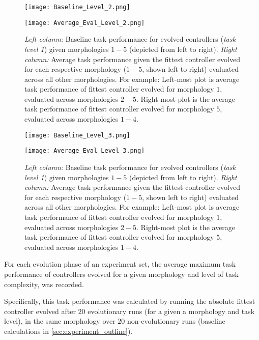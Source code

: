 \begin{figure*}[t]
	\begin{minipage}{0.5\textwidth}
		\texttt{[image: Baseline\_Level\_2.png]}
	\end{minipage}
	\begin{minipage}{0.5\textwidth}
		\texttt{[image: Average\_Eval\_Level\_2.png]}
	\end{minipage}
\caption{\textit{Left column:} Baseline task performance for evolved controllers (\textit{task level 1})
given morphologies $1-5$ (depicted from left to right).
\textit{Right column:} Average task performance given the fittest controller evolved
for each respective morphology ($1-5$, shown left to right) evaluated across all other morphologies.
For example: Left-most plot is average task performance of fittest controller evolved for
morphology $1$, evaluated across morphologies $2-5$.  Right-most plot is the average task performance
of fittest controller evolved for morphology $5$, evaluated across morphologies $1-4$.}\label{fig:level2results}
\end{figure*}

\begin{figure*}[t]
	\begin{minipage}{0.5\textwidth}
		\texttt{[image: Baseline\_Level\_3.png]}
	\end{minipage}
	\begin{minipage}{0.5\textwidth}
		\texttt{[image: Average\_Eval\_Level\_3.png]}
	\end{minipage}
\caption{\textit{Left column:} Baseline task performance for evolved controllers (\textit{task level 1})
given morphologies $1-5$ (depicted from left to right).
\textit{Right column:} Average task performance given the fittest controller evolved
for each respective morphology ($1-5$, shown left to right) evaluated across all other morphologies.
For example: Left-most plot is average task performance of fittest controller evolved for
morphology $1$, evaluated across morphologies $2-5$.  Right-most plot is the average task performance
of fittest controller evolved for morphology $5$, evaluated across morphologies $1-4$.}\label{fig:level3results}
\end{figure*}


For each evolution phase of an experiment set, the average maximum task performance
of controllers evolved for a given morphology and level of task complexity, was recorded.

Specifically, this task performance was calculated by running the absolute fittest controller
evolved after $20$ evolutionary runs (for a given a morphology and task level),
in the same morphology over $20$ non-evolutionary runs (baseline calculations in \ref{sec:experiment_outline}).


